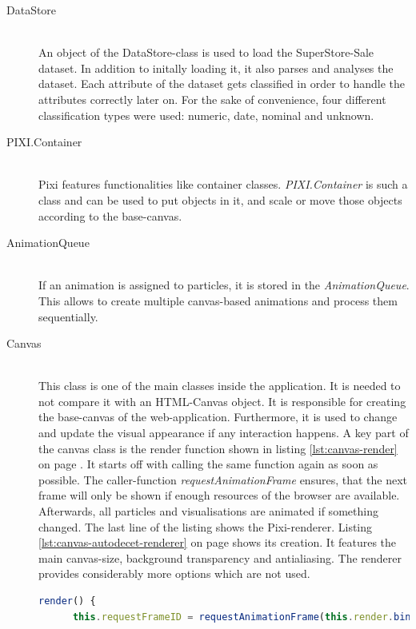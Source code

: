\begin{description}
\item[DataStore] \hfill \\
An object of the DataStore-class is used to load the SuperStore-Sale dataset. In addition to initally loading it, it also parses and analyses the dataset. Each attribute of the dataset gets classified in order to handle the attributes correctly later on. For the sake of convenience, four different classification types were used: numeric, date, nominal and unknown.

\item[PIXI.Container] \hfill \\
\ac{Pixi} features functionalities like container classes. \textit{PIXI.Container} is such a class and can be used to put objects in it, and scale or move those objects according to the base-canvas.

\item[AnimationQueue] \hfill \\
If an animation is assigned to particles, it is stored in the \textit{AnimationQueue}. This allows to create multiple canvas-based animations and process them sequentially.

\item[Canvas] \hfill \\
This class is one of the main classes inside the application. It is needed to not compare it with an HTML-Canvas object. It is responsible for creating the base-canvas of the web-application. Furthermore, it is used to change and update the visual appearance if any interaction happens. A key part of the canvas class is the render function shown in listing \ref{lst:canvas-render} on page \pageref{lst:canvas-render}. It starts off with calling the same function again as soon as possible. The caller-function \textit{requestAnimationFrame} ensures, that the next frame will only be shown if enough resources of the browser are available. Afterwards, all particles and visualisations are animated if something changed. The last line of the listing shows the \ac{Pixi}-renderer. Listing \ref{lst:canvas-autodecet-renderer} on page \pageref{lst:canvas-autodecet-renderer} shows its creation. It features the main canvas-size, background transparency and antialiasing. The renderer provides considerably more options which are not used.

\begin{lstlisting}[language=JavaScript, caption={Render function of the canvas class.}, label={lst:canvas-render}]
    render() {
      this.requestFrameID = requestAnimationFrame(this.render.bind(this));


\end{lstlisting}
\end{description}
